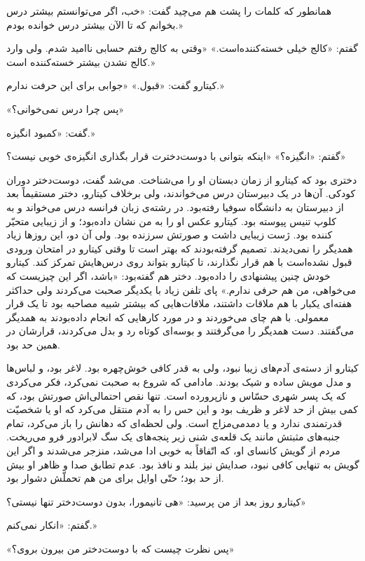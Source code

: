 \documentclass[a5paper]{book}
\begin{document}
همانطور که کلمات را پشت هم می‌چید گفت: «خب، اگر می‌توانستم بیشتر درس بخوانم که تا الآن بیشتر درس خوانده بودم.»

گفتم: «کالج خیلی خسته‌کننده‌است.» «وقتی به کالج رفتم حسابی ناامید شدم. ولی وارد کالج نشدن بیشتر خسته‌کننده است.»

کیتارو گفت: «قبول.» «جوابی برای این حرفت ندارم.»

«پس چرا درس نمی‌خوانی؟»

گفت: «کمبود انگیزه.»

گفتم: «انگیزه؟» «اینکه بتوانی با دوست‌دخترت قرار بگذاری انگیزه‌ی خوبی نیست؟»

دختری بود که کیتارو از زمان دبستان او را می‌شناخت. می‌شد گفت، دوست‌دختر دوران کودکی. آن‌ها در یک دبیرستان درس می‌خواندند، ولی برخلاف کیتارو، دختر مستقیماً بعد از دبیرستان به دانشگاه سوفیا رفته‌بود.  در رشته‌ی زبان فرانسه درس می‌خواند و به کلوپ تنیس پیوسته بود. کیتارو عکس او را به من نشان داده‌بود؛ و از زیبایی متحیّر کننده بود. ژست زیبایی داشت و صورتش سرزنده بود. ولی آن دو، این روزها زیاد همدیگر را نمی‌دیدند. تصمیم گرفته‌بودند که بهتر است تا وقتی کیتارو در امتحان ورودی قبول نشده‌است با هم قرار نگذارند، تا کیتارو بتواند روی درس‌هایش تمرکز کند. کیتارو خودش چنین پیشنهادی را داده‌بود. دختر هم گفته‌بود: «باشد، اگر این چیزیست که می‌خواهی، من هم حرفی ندارم.» پای تلفن زیاد با یکدیگر صحبت می‌کردند ولی حداکثر هفته‌ای یکبار با هم ملاقات داشتند، ملاقات‌هایی که بیشتر شبیه مصاحبه بود تا یک قرار معمولی.  با هم چای می‌خوردند و در مورد کارهایی که انجام داده‌بودند به همدیگر می‌گفتند. دست همدیگر را می‌گرفتند و بوسه‌ای کوتاه رد و بدل می‌کردند، قرارشان در همین حد بود.

کیتارو از دسته‌ی آدم‌های زیبا نبود، ولی به قدر کافی خوش‌چهره بود. لاغر بود، و لباس‌ها و مدل مویش ساده و شیک بودند. مادامی که شروع به صحبت نمی‌کرد، فکر می‌کردی که یک پسر شهری حسّاس و نازپرورده است. تنها نقص احتمالی‌اش صورتش بود، که کمی بیش از حد لاغر و ظریف بود و این حس را به آدم منتقل می‌کرد که او یا شخصیّت قدرتمندی ندارد و یا دمدمی‌مزاج است. ولی لحظه‌ای که دهانش را باز می‌کرد، تمام جنبه‌های مثبتش مانند یک قلعه‌ی شنی زیر پنجه‌های یک سگ لابرادور فرو می‌ریخت. مردم از گویش کانسای او، که اتّفاقاً به خوبی ادا می‌شد، منزجر می‌شدند و اگر این گویش به تنهایی کافی نبود، صدایش نیز بلند و نافذ بود. عدم تطابق صدا و ظاهر او بیش از حد بود؛ حتّی اوایل برای من هم تحملّش دشوار بود.

کیتارو روز بعد از من پرسید: «هی تانیمورا، بدون دوست‌دختر تنها نیستی؟»

گفتم: «انکار نمی‌کنم.»

«پس نظرت چیست که با دوست‌دختر من بیرون بروی؟»
\end{document}
